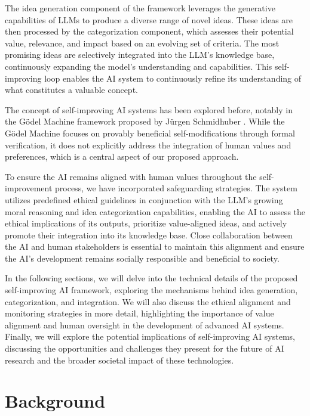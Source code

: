 \documentclass[conference]{article}
\begin{document}
	The idea generation component of the framework leverages the generative capabilities of LLMs to produce a diverse range of novel ideas. These ideas are then processed by the categorization component, which assesses their potential value, relevance, and impact based on an evolving set of criteria. The most promising ideas are selectively integrated into the LLM's knowledge base, continuously expanding the model's understanding and capabilities. This self-improving loop enables the AI system to continuously refine its understanding of what constitutes a valuable concept.
	
	The concept of self-improving AI systems has been explored before, notably in the Gödel Machine framework proposed by Jürgen Schmidhuber \cite{schmidhuber2007godel, steunebrink2016growing}. While the Gödel Machine focuses on provably beneficial self-modifications through formal verification, it does not explicitly address the integration of human values and preferences, which is a central aspect of our proposed approach.
	
	To ensure the AI remains aligned with human values throughout the self-improvement process, we have incorporated safeguarding strategies. The system utilizes predefined ethical guidelines in conjunction with the LLM's growing moral reasoning and idea categorization capabilities, enabling the AI to assess the ethical implications of its outputs, prioritize value-aligned ideas, and actively promote their integration into its knowledge base. Close collaboration between the AI and human stakeholders is essential to maintain this alignment and ensure the AI's development remains socially responsible and beneficial to society.
	
	In the following sections, we will delve into the technical details of the proposed self-improving AI framework, exploring the mechanisms behind idea generation, categorization, and integration. We will also discuss the ethical alignment and monitoring strategies in more detail, highlighting the importance of value alignment and human oversight in the development of advanced AI systems. Finally, we will explore the potential implications of self-improving AI systems, discussing the opportunities and challenges they present for the future of AI research and the broader societal impact of these technologies.
	

	\section{Background}
	
\end{document}
